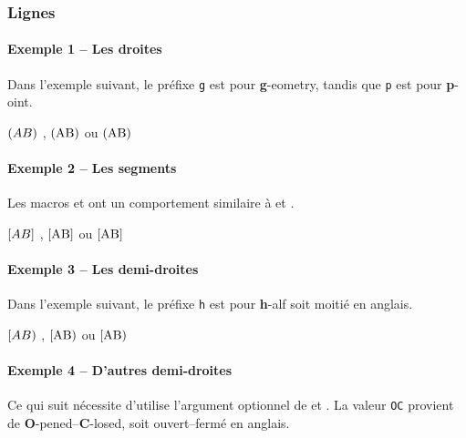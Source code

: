 \documentclass[12pt,a4paper]{article}
\begin{document}
\subsubsection{Lignes}

\paragraph{Exemple 1 -- Les droites}

Dans l'exemple suivant, le préfixe \verb+g+ est pour \textbf{g}-eometry, tandis que \verb+p+ est pour \textbf{p}-oint.

\begin{latexex}
$\gline{A}{B}$ ,
$\gline{\pt{A}}{\pt{B}}$ ou
$\pgline{A}{B}$
\end{latexex}




\paragraph{Exemple 2 -- Les segments}

Les macros  et  ont un comportement similaire à  et .

\begin{latexex}
$\segment{A}{B}$ ,
$\segment{\pt{A}}{\pt{B}}$ ou
$\psegment{A}{B}$
\end{latexex}




\paragraph{Exemple 3 -- Les demi-droites}

Dans l'exemple suivant, le préfixe \verb+h+ est pour \textbf{h}-alf soit moitié en anglais.

\begin{latexex}
$\hgline{A}{B}$ ,
$\hgline{\pt{A}}{\pt{B}}$ ou
$\phgline{A}{B}$
\end{latexex}




\paragraph{Exemple 4 -- D'autres demi-droites}

Ce qui suit nécessite d'utilise l'argument optionnel de  et . La valeur \verb+OC+ provient de \textbf{O}-pened--\textbf{C}-losed, soit ouvert--fermé en anglais.
\end{document}
